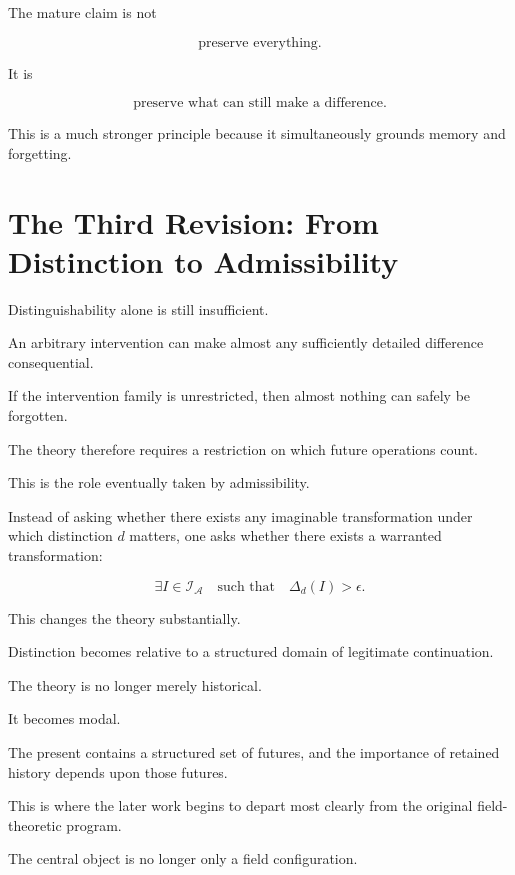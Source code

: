 \documentclass[11pt]{article}
\theoremstyle{remark}
\newcommand{\Adm}{\mathcal{A}}
\begin{document}
The mature claim is not

\begin{equation}
\text{preserve everything}.
\end{equation}

It is

\begin{equation}
\boxed{
\text{preserve what can still make a difference}.
}
\end{equation}

This is a much stronger principle because it simultaneously grounds memory and forgetting.

\section{The Third Revision: From Distinction to Admissibility}

Distinguishability alone is still insufficient.

An arbitrary intervention can make almost any sufficiently detailed difference consequential.

If the intervention family is unrestricted, then almost nothing can safely be forgotten.

The theory therefore requires a restriction on which future operations count.

This is the role eventually taken by admissibility.

Instead of asking whether there exists any imaginable transformation under which distinction $d$ matters, one asks whether there exists a warranted transformation:

\begin{equation}
\exists I\in\mathcal{I}_{\Adm}
\quad
\text{such that}
\quad
\Delta_d(I)>\epsilon.
\end{equation}

This changes the theory substantially.

Distinction becomes relative to a structured domain of legitimate continuation.

The theory is no longer merely historical.

It becomes modal.

The present contains a structured set of futures, and the importance of retained history depends upon those futures.

This is where the later work begins to depart most clearly from the original field-theoretic program.

The central object is no longer only a field configuration.
\end{document}

